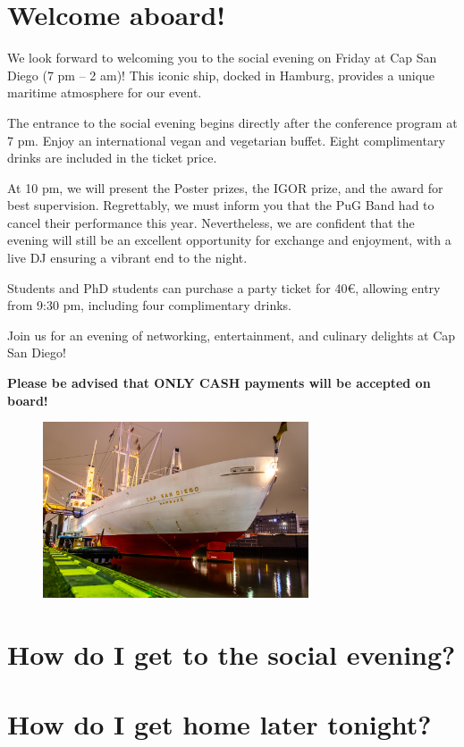 
\setlength{\parskip}{1em}   

\section*{Welcome aboard!}

We look forward to welcoming you to the social evening on Friday at Cap San Diego (7 pm – 2 am)! This iconic ship, docked in Hamburg, provides a unique maritime atmosphere for our event.

The entrance to the social evening begins directly after the conference program at 7 pm. Enjoy an international vegan and vegetarian buffet. Eight complimentary drinks are included in the ticket price.

At 10 pm, we will present the Poster prizes, the IGOR prize, and the award for best supervision. Regrettably, we must inform you that the PuG Band had to cancel their performance this year. Nevertheless, we are confident that the evening will still be an excellent opportunity for exchange and enjoyment, with a live DJ ensuring a vibrant end to the night.

Students and PhD students can purchase a party ticket for 40€, allowing entry from 9:30 pm, including four complimentary drinks.

Join us for an evening of networking, entertainment, and culinary delights at Cap San Diego! 

\textbf{Please be advised that ONLY CASH payments will be accepted on board!}


\begin{figure}[H]
	\centering
	\includegraphics[width=0.7\textwidth]{tex/images/social_event/social4.png}
\end{figure}

\newpage

\section*{How do I get to the social evening?}

\section*{How do I get home later tonight?}